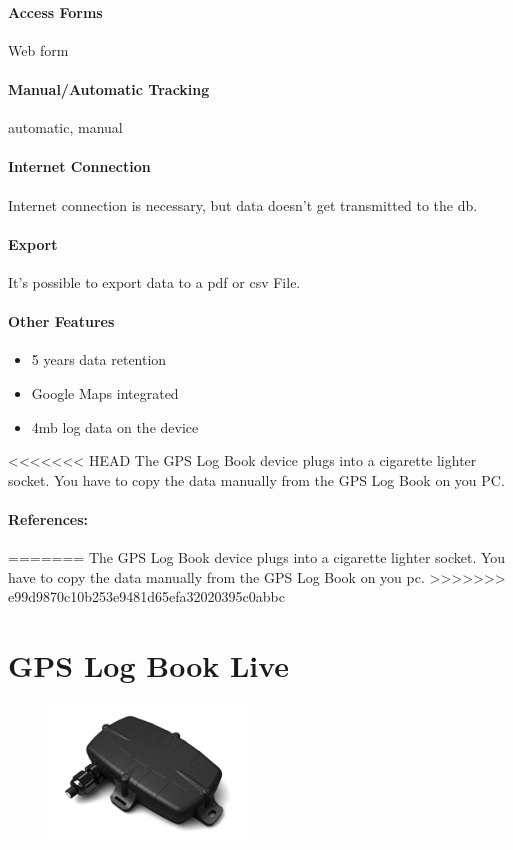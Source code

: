 \paragraph{Access Forms} Web form
\paragraph{Manual/Automatic Tracking}automatic, manual
\paragraph{Internet Connection}Internet connection is necessary, but data doesn't get transmitted to the \gls{db}.
\paragraph{Export}It's possible to export data to a \gls{pdf} or \gls{csv} File.
\paragraph{Other Features}
\begin{itemize}
\item 5 years data retention 
\item Google Maps integrated
\item 4\gls{mb} log data on the device
\end{itemize}
<<<<<<< HEAD
The GPS Log Book device plugs into a cigarette lighter socket. You have to copy the data manually from the GPS Log Book on you PC.
\paragraph{References:} \cite{GPS_Log_Book}
=======
The GPS Log Book device plugs into a cigarette lighter socket. You have to copy the data manually from the GPS Log Book on you \gls{pc}.
>>>>>>> e99d9870c10b253e9481d65efa32020395c0abbc
\newpage

\section{GPS Log Book Live}
\begin{figure}
  \begin{center}
    \includegraphics[width=0.48\textwidth]{bilder/GPSlogbooklive!}
  \end{center}
\end{figure}
